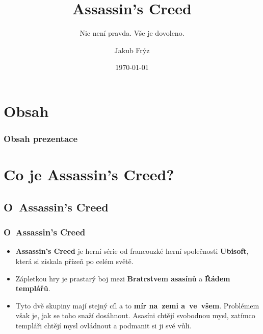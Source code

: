 \documentclass[hyperref={colorlinks, linkcolor=white, urlcolor=green!50!black}]{beamer}
\title[Assassin's Creed]{\textbf{Assassin's Creed}} %
\subtitle{Nic není pravda. Vše je dovoleno.}
\author{Jakub Frýz}
\institute[VUT-FIT]{\textsc{Vysoké učení technické v~Brně} \\ \smallskip Fakulta informačních technologií}
\date{\today}
\begin{document}
\begin{frame}
	\titlepage
\end{frame}

\section{Obsah}

\begin{frame}
\frametitle{Obsah prezentace}
	\begin{multicols}{2}
		\tableofcontents
	\end{multicols}
\end{frame}

\section{Co je Assassin's Creed?}

\subsection{O~Assassin's Creed}

\begin{frame}
\frametitle{O~Assassin's Creed}
\begin{itemize}
	\item \textbf{\color{darkred} Assassin's Creed} je herní série od francouzké herní společnosti \textbf{\color{blendedblue} Ubisoft}, která si získala přízeň po celém světě.
	\item Zápletkou hry je prastarý boj mezi \textbf{\color{blendedblue} Bratrstvem asasínů} a \textbf{\color{blendedblue} Řádem templářů}.
	\item Tyto dvě skupiny mají stejný cíl a to \textbf{\color{green!50!black} mír na~zemi a~ve~všem}. Problémem však je, jak se toho snaží dosáhnout. Asasíni chtějí svobodnou mysl, zatímco templáři chtějí mysl ovládnout a podmanit si ji své vůli.
\end{itemize}

\end{frame}
\end{document}
